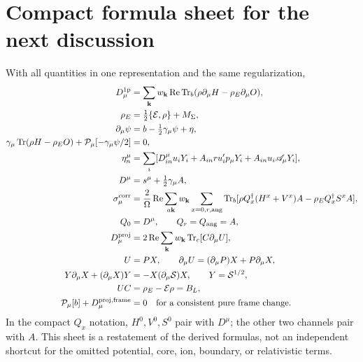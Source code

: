 \documentclass[11pt]{article}
\newcommand{\Tr}{\operatorname{Tr}}
\newcommand{\Rea}{\operatorname{Re}}
\newcommand{\kb}{\mathbf k}
\newcommand{\pa}{\partial_\mu}
\newcommand{\Es}{\mathcal E}
\newcommand{\rE}{{\rho_E}}
\newcommand{\newpart}[1]{\par\Needspace{12\baselineskip}\section{#1}}
\begin{document}
\newpart{Compact formula sheet for the next discussion}
\label{sec:sheet}
With all quantities in one representation and the same regularization,
\begin{align}
 D_\mu^{\rm 1p}&=\sum_\kb w_\kb\Rea\Tr_b
                   (\rho\pa H-\rE\pa O),\\
 \rE&=\tfrac12\{\Es,\rho\}+M_\Sigma,\\
 \pa\psi&=b-\tfrac12\gamma_\mu\psi+\eta,\\
 \gamma_\mu\Tr(\rho H-\rE O)
     +\mathcal P_\mu[-\gamma_\mu\psi/2]&=0,\\
 \eta_n^\mu&=\sum_i[D^\mu_{in}u_iY_i
               +A_{in}r u_i'p_\mu Y_i
               +A_{in}u_i\mathscr A_\mu Y_i],\\
 D^\mu&=s^\mu+\tfrac12\gamma_\mu A,\\
 \sigma_\mu^{\rm corr}
 &=\frac2\Omega\Rea\sum_{a\kb}w_\kb
       \sum_{x=0,r,\mathrm{ang}}
       \Tr_b[\rho Q_x^\dagger(H^x+V^x)A
                        -\rE Q_x^\dagger S^x A],\\
 Q_0&=D^\mu,\qquad Q_r=Q_{\mathrm{ang}}=A,\\
 D_\mu^{\rm proj}&=2\Rea\sum_\kb w_\kb\Tr_c[C\pa U],\\
 U&=PX,\qquad \pa U=(\pa P)X+P\pa X,\\
 Y\pa X+(\pa X)Y&=-X(\pa\mathcal S)X,\qquad Y=\mathcal S^{1/2},\\
 UC&=\rE-\Es\rho=B_L,\\
 \mathcal P_\mu[b]+D_\mu^{\rm proj,frame}&=0
       \quad\text{for a consistent pure frame change}.
\end{align}
In the compact $Q_x$ notation, $H^0,V^0,S^0$ pair with $D^\mu$;
the other two channels pair with $A$. This sheet is a restatement of
the derived formulas, not an independent shortcut for the omitted
potential, core, ion, boundary, or relativistic terms.
\end{document}

